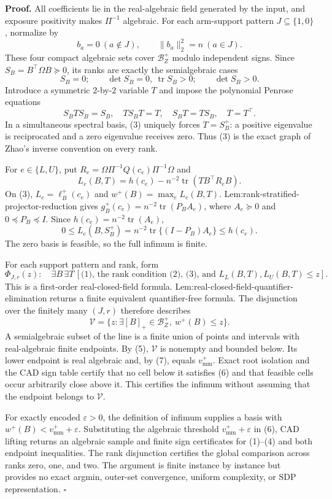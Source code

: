 \textbf{Proof.}
All coefficients lie in the real-algebraic field generated by the input, and exposure positivity makes \(\Pi^{-1}\) algebraic.  For each arm-support pattern \(J\subseteq\{1,0\}\), normalize by
\[
b_a=0\ (a\notin J),\qquad \lVert b_a\rVert_2^2=n\ (a\in J).
\tag{1}
\]
These four compact algebraic sets cover \(\mathcal B_Z^+\) modulo independent signs.  Since \(S_B=B^{\top}\Omega B\succeq0\), its ranks are exactly the semialgebraic cases
\[
S_B=0;\qquad \det S_B=0,\ \operatorname{tr}S_B>0;\qquad \det S_B>0.
\tag{2}
\]
Introduce a symmetric \(2\)-by-\(2\) variable \(T\) and impose the polynomial Penrose equations
\[
S_BTS_B=S_B,\quad TS_BT=T,\quad S_BT=TS_B,\quad T=T^{\top}.
\tag{3}
\]
In a simultaneous spectral basis, (3) uniquely forces \(T=S_B^+\): a positive eigenvalue is reciprocated and a zero eigenvalue receives zero.  Thus (3) is the exact graph of Zhao's inverse convention on every rank.

For \(e\in\{L,U\}\), put \(R_e=\Omega\Pi^{-1}Q(c_e)\Pi^{-1}\Omega\) and
\[
L_e(B,T)=h(c_e)-n^{-2}\operatorname{tr}(TB^{\top}R_eB).
\tag{4}
\]
On (3), \(L_e=\ell_B^+(c_e)\) and \(w^+(B)=\max_eL_e(B,T)\).  Lem:rank-stratified-projector-reduction gives \(g_B^+(c_e)=n^{-2}\operatorname{tr}(P_BA_e)\), where \(A_e\succeq0\) and \(0\preceq P_B\preceq I\).  Since \(h(c_e)=n^{-2}\operatorname{tr}(A_e)\),
\[
0\le L_e(B,S_B^+)=n^{-2}\operatorname{tr}\{(I-P_B)A_e\}\le h(c_e).
\tag{5}
\]
The zero basis is feasible, so the full infimum is finite.

For each support pattern and rank, form
\[
\Phi_{J,r}(z):\quad \exists B\,\exists T\,[\text{(1), the rank condition (2), (3), and }L_L(B,T),L_U(B,T)\le z].
\tag{6}
\]
This is a first-order real-closed-field formula.  Lem:real-closed-field-quantifier-elimination returns a finite equivalent quantifier-free formula.  The disjunction over the finitely many \((J,r)\) therefore describes
\[
\mathcal V=\{z:\exists[B]_+\in\mathcal B_Z^+,\ w^+(B)\le z\}.
\tag{7}
\]
A semialgebraic subset of the line is a finite union of points and intervals with real-algebraic finite endpoints.  By (5), \(\mathcal V\) is nonempty and bounded below.  Its lower endpoint is real algebraic and, by (7), equals \(v_{\mathrm{mm}}^+\).  Exact root isolation and the CAD sign table certify that no cell below it satisfies (6) and that feasible cells occur arbitrarily close above it.  This certifies the infimum without assuming that the endpoint belongs to \(\mathcal V\).

For exactly encoded \(\varepsilon>0\), the definition of infimum supplies a basis with \(w^+(B)<v_{\mathrm{mm}}^++\varepsilon\).  Substituting the algebraic threshold \(v_{\mathrm{mm}}^++\varepsilon\) in (6), CAD lifting returns an algebraic sample and finite sign certificates for (1)--(4) and both endpoint inequalities.  The rank disjunction certifies the global comparison across ranks zero, one, and two.  The argument is finite instance by instance but provides no exact argmin, outer-set convergence, uniform complexity, or SDP representation. \(\square\)